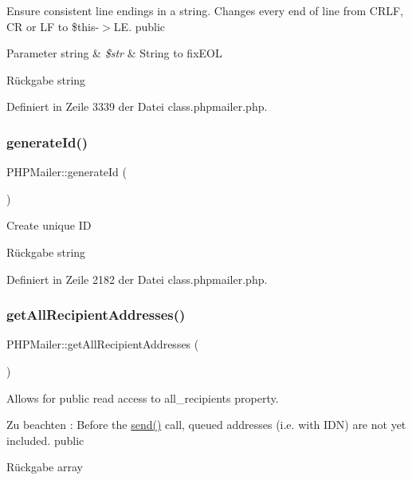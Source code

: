 Ensure consistent line endings in a string. Changes every end of line from C\+R\+LF, CR or LF to \$this-\/$>$LE.  public 
\begin{DoxyParams}[1]{Parameter}
string & {\em \$str} & String to fix\+E\+OL \\
\hline
\end{DoxyParams}
\begin{DoxyReturn}{Rückgabe}
string 
\end{DoxyReturn}


Definiert in Zeile 3339 der Datei class.\+phpmailer.\+php.

\mbox{\label{class_p_h_p_mailer_ab79ccb83e1ad0e442d50bd09587ff879}} 
\subsubsection{\texorpdfstring{generate\+Id()}{generateId()}}
{\footnotesize\ttfamily P\+H\+P\+Mailer\+::generate\+Id (\begin{DoxyParamCaption}{ }\end{DoxyParamCaption})\hspace{0.3cm}{\ttfamily [protected]}}

Create unique ID \begin{DoxyReturn}{Rückgabe}
string 
\end{DoxyReturn}


Definiert in Zeile 2182 der Datei class.\+phpmailer.\+php.

\mbox{\label{class_p_h_p_mailer_a32cd11f072a716c6e03be18e91882a3e}} 
\subsubsection{\texorpdfstring{get\+All\+Recipient\+Addresses()}{getAllRecipientAddresses()}}
{\footnotesize\ttfamily P\+H\+P\+Mailer\+::get\+All\+Recipient\+Addresses (\begin{DoxyParamCaption}{ }\end{DoxyParamCaption})}

Allows for public read access to \textquotesingle{}all\+\_\+recipients\textquotesingle{} property. \begin{DoxyNote}{Zu beachten}
\+: Before the \mbox{\hyperlink{class_p_h_p_mailer_afdd4742f07cfb0bfa7be86ce20468fa3}{send()}} call, queued addresses (i.\+e. with I\+DN) are not yet included.  public 
\end{DoxyNote}
\begin{DoxyReturn}{Rückgabe}
array 
\end{DoxyReturn}


